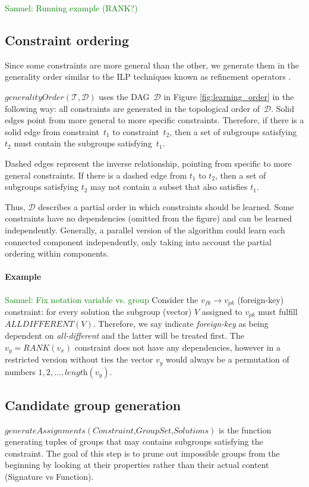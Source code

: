 \documentclass{ecai}
\newcommand{\samuel}[1]{\textcolor{green}{{\sc Samuel:} #1}\xspace}
\newcommand{\constraints}{\ensuremath{\mathcal{T}}\xspace}
\newcommand{\format}[1]{\textit{#1}\xspace}
\newcommand{\generategroups}{\format{generateAssignments}}
\newcommand{\constrainttorder}{\format{generalityOrder}}
\newcommand{\CSignature}{Signature\xspace}
\newcommand{\CFunction}{Function\xspace}
\newcommand{\dependencies}{\ensuremath{\mathcal{D}}\xspace}
\newcommand{\eccalc}[2]{\ensuremath{#1 = #2}}
\newcommand{\ecrank}[2]{\eccalc{#1}{\mathit{RANK}(#2)}}
\newcommand{\ecfkey}[2]{\ensuremath{#1 \rightarrow #2}}
\newcommand{\ecalldiff}[1]{\ensuremath{\mathit{ALLDIFFERENT}(#1)}}
\begin{document}
\samuel{Running example (RANK?)}

\subsection{Constraint ordering} 
Since some constraints are more general than the other, we generate them in the generality order similar to the ILP techniques known as refinement operators \cite{luc_book}.

$\constrainttorder(\constraints,\dependencies)$ uses the DAG~\dependencies in Figure \ref{fig:learning_order} in the following way: all constraints are generated in the topological order of~\dependencies.
Solid edges point from more general to more specific constraints.
Therefore, if there is a solid edge from constraint~$t_1$ to constraint~$t_2$, then a set of subgroups satisfying~$t_2$ must contain the subgroups satisfying~$t_1$.

Dashed edges represent the inverse relationship, pointing from specific to more general constraints.
If there is a dashed edge from $t_1$ to $t_2$, then a set of subgroups satisfying $t_2$ may not contain a subset that also satisfies $t_1$.

Thus, \dependencies describes a partial order in which constraints should be learned.
Some constraints have no dependencies (omitted from the figure) and can be learned independently.
Generally, a parallel version of the algorithm could learn each connected component independently, only taking into account the partial ordering within components.

\paragraph{Example}
\samuel{Fix notation variable vs. group}
Consider the \ecfkey{v_{fk}}{v_{pk}} (foreign-key) constraint: for every solution the subgroup (vector) $V$ assigned to $\mathit{v_{pk}}$ must fulfill \ecalldiff{V}.
Therefore, we say indicate \textit{foreign-key} as being dependent on \textit{all-different} and the latter will be treated first.
The \ecrank{v_y}{v_x} constraint does not have any dependencies, however in a restricted version without ties the vector $v_y$ would always be a permutation of numbers $1, 2, ..., \textit{length}(v_y)$.

\subsection{Candidate group generation}
$\generategroups(\textit{Constraint,GroupSet,Solutions})$ is the function generating tuples of groups that may contains subgroups satisfying the constraint.
The goal of this step is to prune out impossible groups from the beginning by looking at their properties rather than their actual content (\CSignature vs \CFunction).
\end{document}
